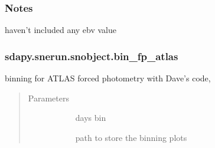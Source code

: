 \documentclass[letterpaper,10pt,english]{sphinxmanual}
\begin{document}
\begin{fulllineitems}
\begin{fulllineitems}
\begin{quote}
\begin{description}
\end{description}\end{quote}



\begin{description}
\item[{{\hyperref[\detokenize{generated/sdapy.snerun.snobject.calc_colors:sdapy.snerun.snobject.calc_colors}]{}}}] \leavevmode
\end{description}


\subsubsection*{Notes}

haven’t included any ebv value

\end{fulllineitems}



\subsubsection{sdapy.snerun.snobject.bin\_fp\_atlas}
\label{\detokenize{generated/sdapy.snerun.snobject.bin_fp_atlas:sdapy-snerun-snobject-bin-fp-atlas}}\label{\detokenize{generated/sdapy.snerun.snobject.bin_fp_atlas::doc}}

\begin{fulllineitems}
\label{\detokenize{generated/sdapy.snerun.snobject.bin_fp_atlas:sdapy.snerun.snobject.bin_fp_atlas}}
binning for ATLAS forced photometry with Dave’s code,
\begin{quote}\begin{description}
\item[{Parameters}] \leavevmode\begin{description}
\item[{}] \leavevmode{[}\sphinxtitleref{int}{]}
days bin

\item[{}] \leavevmode{[}\sphinxtitleref{str}{]}
path to store the binning plots


\end{description}
\end{description}
\end{quote}
\end{fulllineitems}
\end{fulllineitems}
\end{document}
